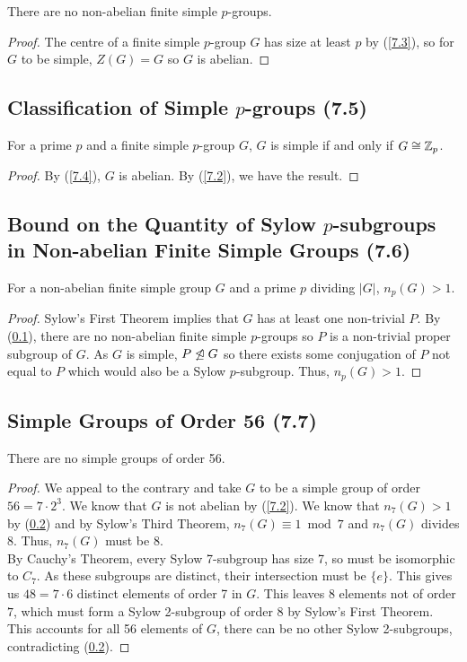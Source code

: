 There are no non-abelian finite simple $p$-groups.

\begin{proof}
    The centre of a finite simple $p$-group $G$ has
    size at least $p$ by (\ref{7.3}), so for $G$ to be simple, $Z(G) = G$
    so $G$ is abelian.
\end{proof}

\subsection{Classification of Simple $p$-groups (7.5)} \label{7.5}

For a prime $p$ and a finite simple $p$-group $G$, $G$ is simple
if and only if $G \cong \mathbb{Z}_p$.

\begin{proof}
    By (\ref{7.4}), $G$ is abelian. By (\ref{7.2}), we have the result.
\end{proof}

\subsection{Bound on the Quantity of Sylow $p$-subgroups 
in Non-abelian Finite Simple Groups (7.6)} \label{7.6}

For a non-abelian finite simple group $G$ and a prime
$p$ dividing $|G|$, $n_p(G) > 1$.

\begin{proof}
    Sylow's First Theorem implies that $G$ has at least one
    non-trivial \Syls $P$. By (\ref{7.5}), there are no
    non-abelian finite simple $p$-groups so $P$ is a
    non-trivial proper subgroup of $G$.
    As $G$ is simple, $P \not\trianglelefteq G$ so there exists
    some conjugation of $P$ not equal to $P$ which would
    also be a Sylow $p$-subgroup.
    Thus, $n_p(G) > 1$. 
\end{proof}

\subsection{Simple Groups of Order 56 (7.7)} \label{7.7}

There are no simple groups of order 56.

\begin{proof}
    We appeal to the contrary and take $G$ to be a simple
    group of order $56 = 7 \cdot 2^3$. We know that $G$
    is not abelian by (\ref{7.2}). We know that $n_7(G) > 1$
    by (\ref{7.6}) and by Sylow's Third Theorem, 
    $n_7(G) \equiv 1 \bmod 7$ and $n_7(G)$ divides 8.
    Thus, $n_7(G)$ must be 8.
    \\[\baselineskip]
    By Cauchy's Theorem, every Sylow 7-subgroup has size 7,
    so must be isomorphic to $C_7$. As these subgroups
    are distinct, their intersection must be $\{e\}$.
    This gives us $48 = 7 \cdot 6$ distinct elements of
    order 7 in $G$. This leaves 8 elements not of order $7$,
    which must form a Sylow 2-subgroup of order $8$ by Sylow's
    First Theorem. This accounts for all 56 elements of $G$,
    there can be no other Sylow 2-subgroups, contradicting
    (\ref{7.6}).
\end{proof}

